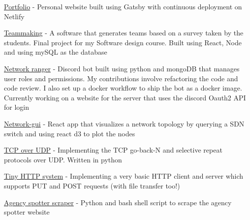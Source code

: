 
\href{https://rsun.dev}{Portfolio} - Personal website built using Gatsby with continuous deployment on Netlify
    
\href{https://github.com/ngrover2/teammaking}{Teammaking} - A software that generates teams based on a survey taken by the students. Final project for my Software design course. Built using React, Node and using mySQL as the database

\href{https://github.com/networking-discord/network-ranger}{Network ranger} - Discord bot built using python and mongoDB that manages user roles and permissions. My contributions involve refactoring the code and code review. I also set up a docker workflow to ship the bot as a docker image. Currently working on a website for the server that uses the
discord Oauth2 API for login
    
\href{https://github.com/rahul-sundaresan/network-gui/}{Network-gui} - React app that visualizes a network topology by querying a SDN switch and using react d3 to plot the nodes

\href{https://github.com/rahul-sundaresan/ccn-6166-p2}{TCP over UDP} - Implementing the TCP go-back-N and selective repeat protocols over UDP. Written in python

\href{https://github.com/rahul-sundaresan/6166-project-1}{Tiny HTTP system} - Implementing a very basic HTTP client and server which supports PUT and POST requests (with file transfer too!)

\href{https://github.com/rahul-sundaresan/agency-spotter-scraper}{Agency spotter scraper} - Python and bash shell script to scrape the agency spotter website
